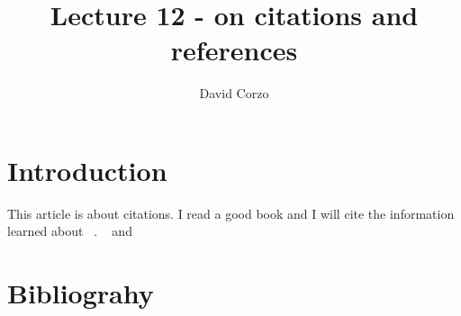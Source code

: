 \documentclass{article}
\title{Lecture 12 - on citations and references}
\author{David Corzo}
\date{}
\begin{document}
\maketitle


\section{Introduction}

This article is about citations. I read a good book and I will cite the information learned about ~\cite{article1}. ~\cite{book2} and ~\cite{misc3}

\section{Bibliograhy}



\end{document}
